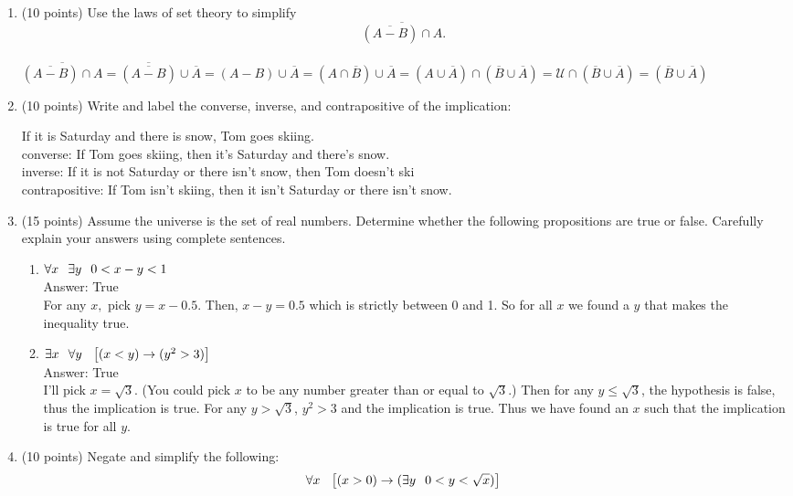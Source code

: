 \documentclass{amsart}
\newcommand{\un}{\mathcal{U}}
\begin{document}
{\begin{center}
\begin{enumerate}
\item(10 points) Use the laws of set theory to simplify
$$\overline{(\overline{A-B}) \cap A}.$$
\\ $ \overline{(\overline{A-B}) \cap A}= \overline{(\overline{A-B})} \cup \overline{A}
= (A-B) \cup \overline{A}= (A \cap \overline{B}) \cup \overline{A}
 = (A \cup \overline{A}) \cap (\overline{B} \cup \overline{A}) =
\un \cap  (\overline{B} \cup \overline{A})= (\overline{B} \cup
\overline{A})$
\item (10 points) Write and label the converse, inverse, and contrapositive
of the implication:

If it is Saturday and there is snow,  Tom goes skiing. \\
converse: If Tom goes skiing, then it's Saturday and there's snow.
\\
inverse: If it is not Saturday or there isn't snow, then Tom doesn't
ski \\
contrapositive: If Tom isn't skiing, then it isn't Saturday or there
isn't snow.\\

\item (15 points) Assume the universe is the set of real numbers.
Determine whether the following propositions are true or false.
Carefully explain your answers using complete sentences.
\begin{enumerate}
\item $\forall x \hspace{.1in}\exists y \hspace{.1in} 0 < x-y < 1$
\\Answer: True \\
For any $x,$ pick $y=x-0.5.$ Then, $x-y=0.5$ which is strictly
between 0 and 1. So for all $x$ we found a $y$ that makes the
inequality true.\\
\item $ \exists x \hspace{.1in} \forall y  \hspace{.1in}
\left[ (x<y) \rightarrow (y^2 > 3) \right]$\\ Answer: True \\
I'll pick $x = \sqrt{3}.$ (You could pick $x$ to be any number
greater than or equal to $\sqrt{3}.$) Then for any $y \leq
\sqrt{3}$, the hypothesis is false, thus the implication is true.
For any $y > \sqrt{3}$, $y^2 > 3$ and the implication is true. Thus
we have found
an $x$ such that the implication is true for all $y$.\\
\end{enumerate}
\item (10 points) Negate and simplify the following:
$$ \forall x \hspace{.1in}\left[(x >0) \rightarrow (
\exists y \hspace{.1in} 0 < y < \sqrt{x}) \right]$$ \\


\end{enumerate}
\end{center}}
\end{document}
